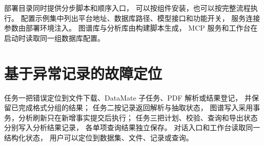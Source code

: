 部署目录同时提供分步脚本和顺序入口，
可以按组件安装，也可以按完整流程执行。
配置示例集中列出平台地址、数据库路径、模型接口和功能开关，
服务连接参数由部署环境注入。
图谱库与分析库由构建脚本生成，
MCP 服务和工作台在启动时读取同一组数据库配置。

\section{基于异常记录的故障定位}

\enlargethispage{2\baselineskip}
任务一把错误定位到文件下载、DataMate 子任务、PDF 解析或结果登记，
并保留已完成格式分组的结果；
任务二按记录返回解析与抽取状态，
图谱写入采用事务，分析刷新只在新增事实提交后执行；
任务三把计划、校验、查询和导出状态分别写入分析结果记录，
各单项查询结果独立保存。
对话入口和工作台读取同一结构化状态，
用户可以定位到数据集、文件、记录或查询。
